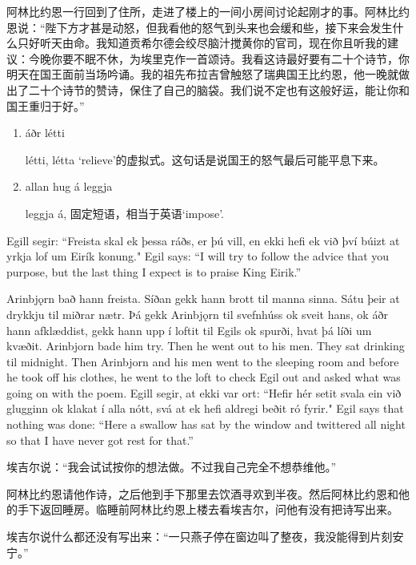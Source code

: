 \begin{translation*}{}
  阿林比约恩一行回到了住所，走进了楼上的一间小房间讨论起刚才的事。阿林比约恩说：“陛下方才甚是动怒，但我看他的怒气到头来也会缓和些，接下来会发生什么只好听天由命。我知道贡希尔德会绞尽脑汁搅黄你的官司，现在你且听我的建议：今晚你要不眠不休，为埃里克作一首颂诗。我看这诗最好要有二十个诗节，你明天在国王面前当场吟诵。我的祖先布拉吉曾触怒了瑞典国王比约恩，他一晚就做出了二十个诗节的赞诗，保住了自己的脑袋。我们说不定也有这般好运，能让你和国王重归于好。”
\end{translation*}
\begin{grammar*}{}
  \begin{enumerate}[leftmargin=*]
    \item áðr létti

          létti, létta `relieve'的虚拟式。这句话是说国王的怒气最后可能平息下来。
    \item allan hug á leggja

          leggja á, 固定短语，相当于英语`impose'.
  \end{enumerate}
\end{grammar*}
\begin{paracol}{2}
  Egill segir: ``Freista skal ek þessa ráðs, er þú vill, en ekki hefi ek við því búizt at yrkja lof um Eirík konung."
  \switchcolumn
  Egil says: ``I will try to follow the advice that you purpose, but the last thing I expect is to praise King Eirik.''

  \switchcolumn*
  Arinbjǫrn bað hann freista. Síðan gekk hann brott til manna sinna. Sátu þeir at drykkju til miðrar nætr. Þá gekk Arinbjǫrn til svefnhúss ok sveit hans, ok áðr hann afklæddist, gekk hann upp í loftit til Egils ok spurði, hvat þá líði um kvæðit.
  \switchcolumn
  Arinbjorn bade him try. Then he went out to his men. They sat drinking til midnight. Then Arinbjorn and his men went to the sleeping room and before he took off his clothes, he went to the loft to check Egil out and asked what was going on with the poem.
  \switchcolumn*
  Egill segir, at ekki var ort: ``Hefir hér setit svala ein við glugginn ok klakat í alla nótt, svá at ek hefi aldregi beðit ró fyrir."
  \switchcolumn
  Egil says that nothing was done: ``Here a swallow has sat by the window and twittered all night so that I have never got rest for that.''

\end{paracol}
\begin{translation*}{}
  埃吉尔说：“我会试试按你的想法做。不过我自己完全不想恭维他。”

  阿林比约恩请他作诗，之后他到手下那里去饮酒寻欢到半夜。然后阿林比约恩和他的手下返回睡房。临睡前阿林比约恩上楼去看埃吉尔，问他有没有把诗写出来。

  埃吉尔说什么都还没有写出来：“一只燕子停在窗边叫了整夜，我没能得到片刻安宁。”

\end{translation*}
